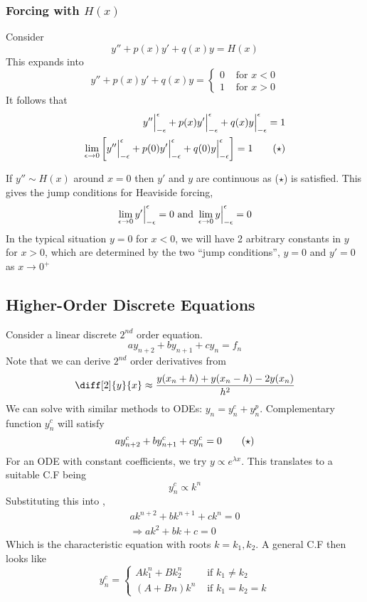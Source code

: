 \documentclass{article}
\begin{document}
\subsubsection{Forcing with $H(x)$}
Consider
\[
    y'' + p(x)y' + q(x)y = H(x)  
\]
This expands into
\[
    y'' + p(x)y' + q(x)y = \begin{cases}
        0 & \text{ for } x < 0 \\
        1 & \text{ for } x > 0
    \end{cases}
\]
It follows that
\begin{align*}
    y'' \Big{|}_{-\epsilon}^{\epsilon} + p(x)y' \Big{|}_{-\epsilon}^{\epsilon} + q(x)y \Big{|}_{-\epsilon}^{\epsilon} = 1 \\
    \lim_{\epsilon \rightarrow 0} \left[ y'' \Big{|}_{-\epsilon}^{\epsilon} + p(0)y' \Big{|}_{-\epsilon}^{\epsilon} + q(0)y \Big{|}_{-\epsilon}^{\epsilon} \right] = 1 \tag{$\star$}
\end{align*}

If $y'' \sim H(x)$ around $x = 0$ then $y'$ and $y$ are continuous as ($\star$) is satisfied.
This gives the jump conditions for Heaviside forcing,
\[
    \lim_{\epsilon \rightarrow 0} y' \Big{|}_{-\epsilon}^{\epsilon} = 0 \text{ and } \lim_{\epsilon \rightarrow 0} y \Big{|}_{-\epsilon}^{\epsilon} = 0
\]
In the typical situation $y = 0$ for $x < 0$, we will have 2 arbitrary constants in $y$ for $x > 0$, which are determined by the two ``jump conditions'',
$y = 0$ and $y' = 0$ as $x \rightarrow 0^+$

\subsection{Higher-Order Discrete Equations}
Consider a linear discrete $2^{nd}$ order equation.
\[
    a y_{n+2} + b y_{n+1} + c y_n = f_n  
\]
Note that we can derive $2^{nd}$ order derivatives from
\[
    \diff[2]{y}{x} \approx \frac{y(x_n + h) + y(x_n - h) - 2y(x_n)}{h^2}
\]
We can solve with similar methods to ODEs: $y_n = y^{c}_n + y^p_n$.
Complementary function $y^c_n$ will satisfy
\[
    a y^c_{n+2} + b y^c_{n+1} + c y^c_n = 0 \tagstar
\]
For an ODE with constant coefficients, we try $y \propto e^{\lambda x}$.
This translates to a suitable C.F being
\[
    y^c_n \propto k^n
\]
Substituting this into ,
\begin{align*}
    a k^{n+2} + b k^{n+1} + c k^n = 0 \\
    \Rightarrow a k^2 + bk + c = 0
\end{align*}
Which is the characteristic equation with roots $k = k_1, k_2$.
A general C.F then looks like
\[
    y^c_n = \begin{cases}
        A k_1^n + B k_2^n & \text{ if } k_1 \neq k_2 \\
        (A + Bn) k^n & \text{ if } k_1 = k_2 = k
    \end{cases}
\]
\end{document}
